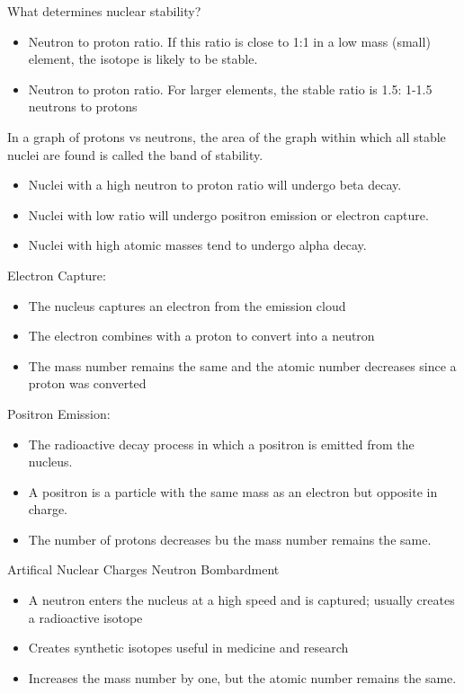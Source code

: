 \documentclass[../hchem.tex]{subfiles}
\begin{document}
What determines nuclear stability?
\begin{itemize}
    \item Neutron to proton ratio. If this ratio is close to 1:1 in a low mass (small) element, the isotope is likely to be stable.
    \item Neutron to proton ratio. For larger elements, the stable ratio is 1.5: 1-1.5 neutrons to protons
\end{itemize}

In a graph of protons vs neutrons, the area of the graph within which all stable nuclei are found is called the band of stability.

\begin{itemize}
    \item Nuclei with a high neutron to proton ratio will undergo beta decay.
    \item Nuclei with low ratio will undergo positron emission or electron capture.
    \item Nuclei with high atomic masses tend to undergo alpha decay.
\end{itemize}

Electron Capture:
\begin{itemize}
    \item The nucleus captures an electron from the emission cloud 
    \item The electron combines with a proton to convert into a neutron 
    \item The mass number remains the same and the atomic number decreases since a proton was converted 
\end{itemize}

Positron Emission:
\begin{itemize}
    \item The radioactive decay process in which a positron is emitted from the nucleus.
    \item A positron is a particle with the same mass as an electron but opposite in charge.
    \item The number of protons decreases bu the mass number remains the same.
\end{itemize}

Artifical Nuclear Charges Neutron Bombardment
\begin{itemize}
    \item A neutron enters the nucleus at a high speed and is captured; usually creates a radioactive isotope 
    \item Creates synthetic isotopes useful in medicine and research 
    \item Increases the mass number by one, but the atomic number remains the same.
\end{itemize}
\end{document}
